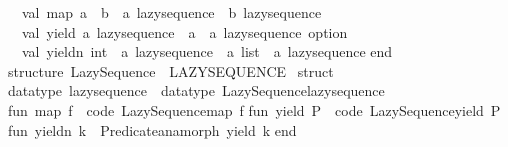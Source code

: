 \begin{isabellebody}
\ \ val\ map{\isacharcolon}{\kern0pt}\ {\isacharparenleft}{\kern0pt}{\isacharprime}{\kern0pt}a\ {\isacharminus}{\kern0pt}{\isachargreater}{\kern0pt}\ {\isacharprime}{\kern0pt}b{\isacharparenright}{\kern0pt}\ {\isacharminus}{\kern0pt}{\isachargreater}{\kern0pt}\ {\isacharprime}{\kern0pt}a\ lazy{\isacharunderscore}{\kern0pt}sequence\ {\isacharminus}{\kern0pt}{\isachargreater}{\kern0pt}\ {\isacharprime}{\kern0pt}b\ lazy{\isacharunderscore}{\kern0pt}sequence\isanewline
\ \ val\ yield{\isacharcolon}{\kern0pt}\ {\isacharprime}{\kern0pt}a\ lazy{\isacharunderscore}{\kern0pt}sequence\ {\isacharminus}{\kern0pt}{\isachargreater}{\kern0pt}\ {\isacharparenleft}{\kern0pt}{\isacharprime}{\kern0pt}a\ {\isacharasterisk}{\kern0pt}\ {\isacharprime}{\kern0pt}a\ lazy{\isacharunderscore}{\kern0pt}sequence{\isacharparenright}{\kern0pt}\ option\isanewline
\ \ val\ yieldn{\isacharcolon}{\kern0pt}\ int\ {\isacharminus}{\kern0pt}{\isachargreater}{\kern0pt}\ {\isacharprime}{\kern0pt}a\ lazy{\isacharunderscore}{\kern0pt}sequence\ {\isacharminus}{\kern0pt}{\isachargreater}{\kern0pt}\ {\isacharprime}{\kern0pt}a\ list\ {\isacharasterisk}{\kern0pt}\ {\isacharprime}{\kern0pt}a\ lazy{\isacharunderscore}{\kern0pt}sequence\isanewline
end{\isacharsemicolon}{\kern0pt}\isanewline
\isanewline
structure\ Lazy{\isacharunderscore}{\kern0pt}Sequence\ {\isacharcolon}{\kern0pt}\ LAZY{\isacharunderscore}{\kern0pt}SEQUENCE\ {\isacharequal}{\kern0pt}\isanewline
struct\isanewline
\isanewline
datatype\ lazy{\isacharunderscore}{\kern0pt}sequence\ {\isacharequal}{\kern0pt}\ datatype\ Lazy{\isacharunderscore}{\kern0pt}Sequence{\isachardot}{\kern0pt}lazy{\isacharunderscore}{\kern0pt}sequence{\isacharsemicolon}{\kern0pt}\isanewline
\isanewline
fun\ map\ f\ {\isacharequal}{\kern0pt}\ {\isacharat}{\kern0pt}{\isacharbraceleft}{\kern0pt}code\ Lazy{\isacharunderscore}{\kern0pt}Sequence{\isachardot}{\kern0pt}map{\isacharbraceright}{\kern0pt}\ f{\isacharsemicolon}{\kern0pt}\isanewline
\isanewline
fun\ yield\ P\ {\isacharequal}{\kern0pt}\ {\isacharat}{\kern0pt}{\isacharbraceleft}{\kern0pt}code\ Lazy{\isacharunderscore}{\kern0pt}Sequence{\isachardot}{\kern0pt}yield{\isacharbraceright}{\kern0pt}\ P{\isacharsemicolon}{\kern0pt}\isanewline
\isanewline
fun\ yieldn\ k\ {\isacharequal}{\kern0pt}\ Predicate{\isachardot}{\kern0pt}anamorph\ yield\ k{\isacharsemicolon}{\kern0pt}\isanewline
\isanewline
end{\isacharsemicolon}{\kern0pt}\isanewline
{\isacartoucheclose}%
\endisatagML
{\isafoldML}%
%
\isadelimML
%
\endisadelimML
%
\isadelimdocument
%
\endisadelimdocument
%
\isatagdocument
%

\end{isabellebody}
